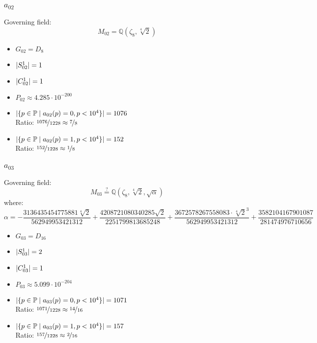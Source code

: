 \subsubsection{$a_{02}$}
Governing field:
$$M_{02} = \mathbb{Q}\left(\zeta_8, \sqrt[4]{2}\right)$$
\begin{multicols}{2}
	\begin{itemize}
		\item $G_{02} = D_8$
		\item $| S_{02}^1 | = 1$
		\item $| C_{02}^1 | = 1$
		\item $P_{02} \approx 4.285 \cdot 10^{-200}$
	\end{itemize}
	\begin{itemize}
		\item $| \{ p \in \mathbb{P} \mid a_{02}(p)=0, p<10^4 \} | = 1076$\\
		Ratio: $\nicefrac{ 1076 }{ 1228 } \approx \nicefrac{ 7 }{ 8 }$
		\item $| \{ p \in \mathbb{P} \mid a_{02}(p)=1, p<10^4 \} | = 152$\\
		Ratio: $\nicefrac{ 152 }{ 1228 } \approx \nicefrac{ 1 }{ 8 }$
	\end{itemize}
\end{multicols}

\subsubsection{$a_{03}$}
Governing field:
$$M_{03} \stackrel{?}{=} \mathbb{Q}\left(\zeta_8, \sqrt[4]{2}, \sqrt{\alpha}\right)$$
where:
$$\alpha = - \frac{3136435454775881 \sqrt[4]{2}}{562949953421312} + \frac{4208721080340285 \sqrt{2}}{2251799813685248} + \frac{3672578267558083 \cdot \sqrt[4]{2}^3}{562949953421312} + \frac{3582104167901087}{281474976710656}$$
\begin{multicols}{2}
	\begin{itemize}
		\item $G_{03} = D_{16}$
		\item $| S_{03}^1 | = 2$
		\item $| C_{03}^1 | = 1$
		\item $P_{03} \approx 5.099 \cdot 10^{-204}$
	\end{itemize}
	\begin{itemize}
		\item $| \{ p \in \mathbb{P} \mid a_{03}(p)=0, p<10^4 \} | = 1071$\\
		Ratio: $\nicefrac{ 1071 }{ 1228 } \approx \nicefrac{ 14 }{ 16 }$
		\item $| \{ p \in \mathbb{P} \mid a_{03}(p)=1, p<10^4 \} | = 157$\\
		Ratio: $\nicefrac{ 157 }{ 1228 } \approx \nicefrac{ 2 }{ 16 }$
	\end{itemize}
\end{multicols}


